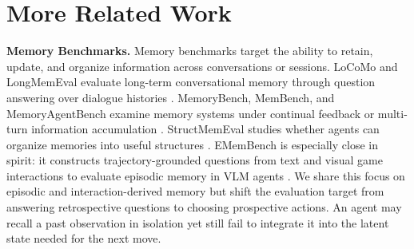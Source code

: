 \documentclass{llmxive}
\begin{document}





\appendix


\section{More Related Work}
\noindent\textbf{Memory Benchmarks.} Memory benchmarks target the ability to retain, update, and organize information across conversations or sessions. LoCoMo and LongMemEval evaluate long-term conversational memory through question answering over dialogue histories \citep{maharana2024locomo,wu2024longmemeval}. MemoryBench, MemBench, and MemoryAgentBench examine memory systems under continual feedback or multi-turn information accumulation \citep{ai2025memorybench,tan2025membench,hu2025memoryagentbench}. StructMemEval studies whether agents can organize memories into useful structures \citep{shutova2026structmemeval}. EMemBench is especially close in spirit: it constructs trajectory-grounded questions from text and visual game interactions to evaluate episodic memory in VLM agents \citep{li2026emembench}. We share this focus on episodic and interaction-derived memory but shift the evaluation target from answering retrospective questions to choosing prospective actions. An agent may recall a past observation in isolation yet still fail to integrate it into the latent state needed for the next move.
\end{document}

